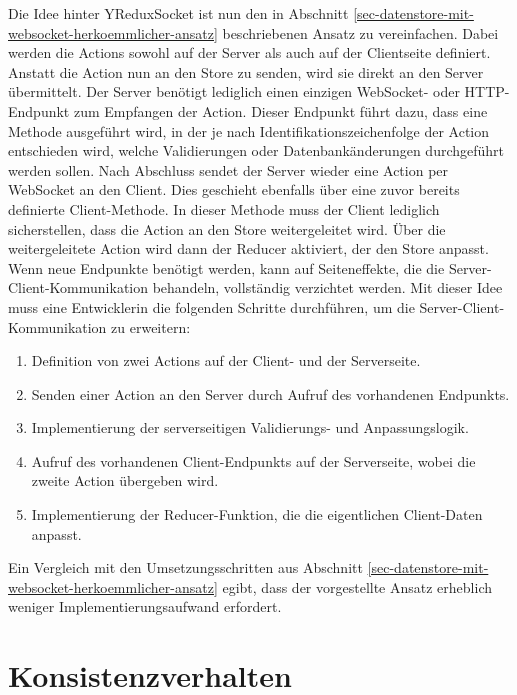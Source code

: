 \documentclass[12pt]{book}          %
\begin{document}
Die Idee hinter YReduxSocket ist nun den in Abschnitt \ref{sec-datenstore-mit-websocket-herkoemmlicher-ansatz} beschriebenen Ansatz zu vereinfachen. Dabei werden die Actions sowohl auf der Server als auch auf der Clientseite definiert. Anstatt die Action nun an den Store zu senden, wird sie direkt an den Server übermittelt. Der Server benötigt lediglich einen einzigen WebSocket- oder HTTP-Endpunkt zum Empfangen der Action. Dieser Endpunkt führt dazu, dass eine Methode ausgeführt wird, in der je nach Identifikationszeichenfolge der Action entschieden wird, welche Validierungen oder Datenbankänderungen durchgeführt werden sollen. Nach Abschluss sendet der Server wieder eine Action per WebSocket an den Client. Dies geschieht ebenfalls über eine zuvor bereits definierte Client-Methode. In dieser Methode muss der Client lediglich sicherstellen, dass die Action an den Store weitergeleitet wird. Über die weitergeleitete Action wird dann der Reducer aktiviert, der den Store anpasst. Wenn neue Endpunkte benötigt werden, kann auf Seiteneffekte, die die Server-Client-Kommunikation behandeln, vollständig verzichtet werden. Mit dieser Idee muss eine Entwicklerin die folgenden Schritte durchführen, um die Server-Client-Kommunikation zu erweitern:
\begin{enumerate}
    \item Definition von zwei Actions auf der Client- und der Serverseite.
    \item Senden einer Action an den Server durch Aufruf des vorhandenen Endpunkts.
    \item Implementierung der serverseitigen Validierungs- und Anpassungslogik.
    \item Aufruf des vorhandenen Client-Endpunkts auf der Serverseite, wobei die zweite Action übergeben wird.
    \item Implementierung der Reducer-Funktion, die die eigentlichen Client-Daten anpasst.
\end{enumerate}

Ein Vergleich mit den Umsetzungsschritten aus Abschnitt \ref{sec-datenstore-mit-websocket-herkoemmlicher-ansatz} egibt, dass der vorgestellte Ansatz erheblich weniger Implementierungsaufwand erfordert.

\section{Konsistenzverhalten}
\label{sec-konsistenzverhalten}
\end{document}
